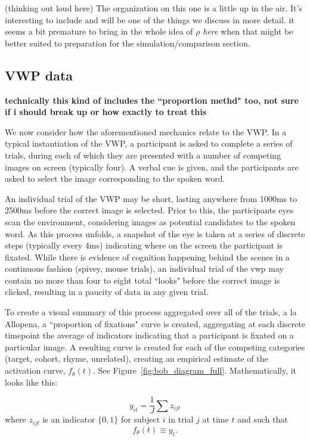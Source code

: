 \documentclass{article}
\begin{document}
(thinking out loud here) The organization on this one is a little up in the air. It's interesting to include and will be one of the things we discuss in more detail. it seems a bit premature to bring in the whole idea of $\rho$ \textit{here} when that might be better suited to preparation for the simulation/comparison section.

\subsection{VWP data}

\textbf{technically this kind of includes the ``proportion methd" too, not sure if i should break up or how exactly to treat this}

We now consider how the aforementioned mechanics relate to the VWP. In a typical instantiation of the VWP, a participant is asked to complete a series of trials, during each of which they are presented with a number of competing images on screen (typically four). A verbal cue is given, and the participants are asked to select the image corresponding to the spoken word.

An individual trial of the VWP may be short, lasting anywhere from 1000ms to 2500ms before the correct image is selected. Prior to this, the participants eyes scan the environment, considering images as potential candidates to the spoken word. As this process unfolds, a snapshot of the eye is taken at a series of discrete steps (typically every 4ms) indicating where on the screen the participant is fixated. While there is evidence of cognition happening behind the scenes in a continuous fashion (spivey, mouse trials), an individual trial of the vwp may contain no more than four to eight total ``looks" before the correct image is clicked, resulting in a paucity of data in any given trial.

To create a visual summary of this process aggregated over all of the trials, a la Allopena, a ``proportion of fixations" curve is created, aggregating at each discrete timepoint the average of indicators indicating that a participant is fixated on a particular image. A resulting curve is created for each of the competing categories (target, cohort, rhyme, unrelated), creating an empirical estimate of the activation curve, $f_{\theta}(t)$. See Figure~\ref{fig:bob_diagram_full}. Mathematically, it looks like this:

\begin{equation}
y_{it} = \frac1J \sum z_{ijt}
\end{equation}
where $z_{ijt}$ is an indicator $\{0, 1\}$ for subject $i$ in trial $j$ at time $t$ and such that
\begin{equation}
f_{\theta}(t) \equiv y_t.
\end{equation}
\end{document}
